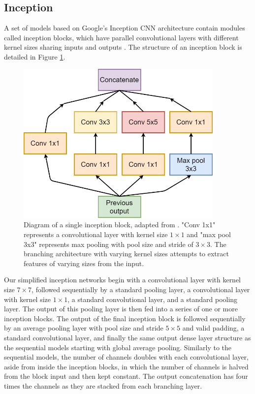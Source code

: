 \documentclass[12pt]{article}
\begin{document}
\subsection{Inception}
A set of models based on Google's Inception CNN architecture contain modules called inception blocks, which have parallel convolutional layers with different kernel sizes sharing inputs and outputs \cite{Szegedy15}. The structure of an inception block is detailed in Figure \ref{incblock}. 
\begin{figure}[!h]
\centering
\includegraphics[width=4in]{images/inception_block.png}
\caption{Diagram of a single inception block, adapted from \cite{Szegedy15}. "Conv 1x1" represents a convolutional layer with kernel size $1\times1$ and "max pool 3x3" represents max pooling with pool size and stride of $3\times3$. The branching architecture with varying kernel sizes attempts to extract features of varying sizes from the input.}
\label{incblock}
\end{figure}
Our simplified inception networks begin with a convolutional layer with kernel size $7\times7$, followed sequentially by a standard pooling layer, a convolutional layer with kernel size $1\times1$, a standard convolutional layer, and a standard pooling layer. The output of this pooling layer is then fed into a series of one or more inception blocks. The output of the final inception block is followed sequentially by an average pooling layer with pool size and stride $5\times5$ and valid padding, a standard convolutional layer, and finally the same output dense layer structure as the sequential models starting with global average pooling. Similarly to the sequential models, the number of channels doubles with each convolutional layer, aside from inside the inception blocks, in which the number of channels is halved from the block input and then kept constant. The output concatenation has four times the channels as they are stacked from each branching layer.
\end{document}
